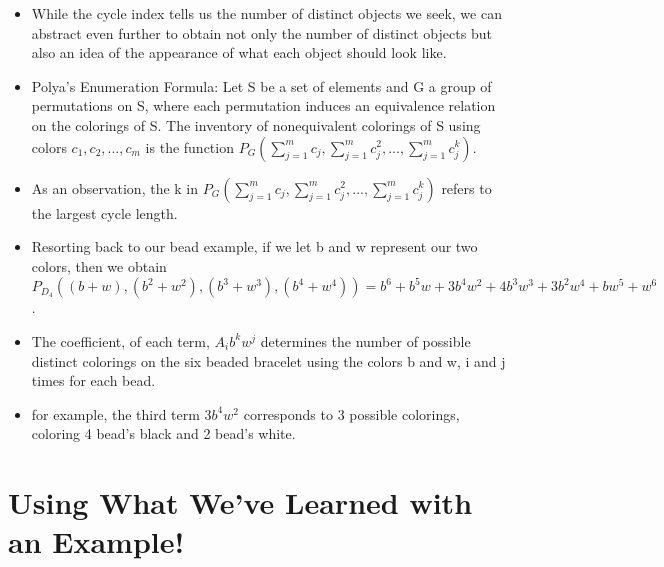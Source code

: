 \documentclass{beamer}
\begin{document}
\begin{frame}
\begin{itemize}

\item While the cycle index tells us the number of distinct objects we seek, we can abstract even further to obtain not only the number of distinct objects but also an idea of the appearance of what each object should look like.

\item Polya's Enumeration Formula: Let S be a set of elements and G a group of permutations on S, where each permutation induces an equivalence relation on the colorings of S. The inventory of nonequivalent colorings of S using colors $c_{1},c_{2},...,c_{m}$ is the function $P_{G}(\sum_{j=1}^{m}c_{j},\sum_{j=1}^{m}c_{j}^{2},...,\sum_{j=1}^{m}c_{j}^{k})$.

\item As an observation, the k in $P_{G}(\sum_{j=1}^{m}c_{j},\sum_{j=1}^{m}c_{j}^{2},...,\sum_{j=1}^{m}c_{j}^{k})$ refers to the largest cycle length.


\end{itemize}
\end{frame}


\begin{frame}
\begin{itemize}

\item Resorting back to our bead example, if we let b and w represent our two colors, then we obtain $P_{D_{4}}((b+w), (b^2+w^2), (b^3+w^3), (b^4+w^4)) = b^6 + b^5w + 3b^4w^2 + 4b^3w^3 + 3b^2w^4 + bw^5 + w^6$.

\item The coefficient, of each term, $A_{i}b^{k}w^{j}$ determines the number of possible distinct colorings on the six beaded bracelet using the colors b and w, i and j times for each bead.

\item for example, the third term $3b^4w^2$ corresponds to 3 possible colorings, coloring 4 bead's black and 2 bead's white.

\end{itemize}
\end{frame}
\section{Using What We've Learned with an Example!}
\end{document}
